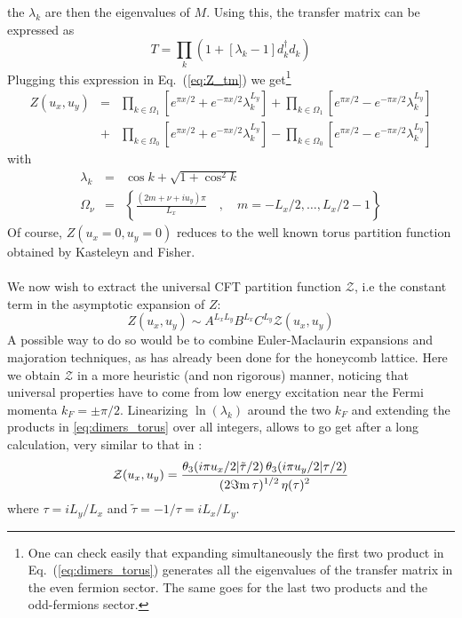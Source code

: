 \documentclass[11pt]{iopart}
\begin{document}
the $\lambda_k$ are then the eigenvalues of $M$. Using this, the transfer matrix can be expressed as
\begin{equation}
 T=\prod_k \left(1+[\lambda_k -1]d_k^\dag d_k \right)
\end{equation}
Plugging this expression in Eq.~(\ref{eq:Z_tm}) we get\footnote{One can check easily that expanding simultaneously the first two product in Eq.~(\ref{eq:dimers_torus}) generates all the eigenvalues of the transfer matrix in the even fermion sector. The same goes for the last two products and the odd-fermions sector. }
\begin{eqnarray}\nonumber
 Z(u_x,u_y)&=&\prod_{k\in \Omega_{1}}\left[e^{\pi x /2}+e^{-\pi x/2}\lambda_k^{L_y}\right]+\prod_{k\in \Omega_{1}}\left[e^{\pi x/2}-e^{-\pi x/2}\lambda_k^{L_y}\right]\\\label{eq:dimers_torus}
 &+&\prod_{k\in \Omega_{0}}\left[e^{\pi x /2}+e^{-\pi x/2}\lambda_k^{L_y}\right]-\prod_{k\in \Omega_{0}}\left[e^{\pi x /2}-e^{-\pi x/2}\lambda_k^{L_y}\right]
\end{eqnarray}
with
\begin{eqnarray}
 \lambda_k&=&\cos k +\sqrt{1+\cos^2 k}\\
\Omega_{\nu}&=&\left\{\frac{(2m+\nu+i u_y) \pi}{L_x}\quad,\quad m=-L_x/2,\ldots,L_x/2-1\right\} 
\end{eqnarray}
Of course, $Z(u_x=0,u_y=0)$ reduces to the well known torus partition function obtained by Kasteleyn and Fisher. 
\paragraph{}We now wish to extract the universal CFT partition function $\mathcal{Z}$, i.e the constant term in the asymptotic expansion of $Z$:
\begin{equation}
 Z(u_x,u_y)\sim A^{L_x L_y} B^{L_x} C^{L_y}\mathcal{Z}(u_x,u_y)
\end{equation}
A possible way to do so would be to combine Euler-Maclaurin expansions and majoration techniques, as has already been done for the honeycomb lattice\cite{Boutillier}. Here we obtain $\mathcal{Z}$ in a more heuristic (and non rigorous) manner, noticing that universal properties have to come from low energy excitation near the Fermi momenta $k_F=\pm \pi/2$. Linearizing $\ln(\lambda_k)$ around the two $k_F$ and extending the products in \ref{eq:dimers_torus} over all integers, allows to go get after a long calculation, very similar to that in \cite{Boutillier}:
\begin{equation}
 \mathcal{Z}(u_x,u_y)=\frac{\displaystyle{\theta_3(i\pi u_x/2|\tilde{\tau}/2)\,\theta_3(i\pi u_y/2|\tau/2)}}{\displaystyle{(2 \Im{\rm m}\, \tau)^{1/2}\,\eta(\tau)^2}}
\end{equation}
where $\tau=i L_y/L_x$ and $\tilde{\tau}=-1/\tau=iL_x/L_y$. 
\end{document}
